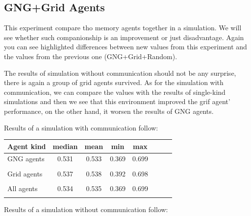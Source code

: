 \clearpage
                                       
\subsection{GNG+Grid Agents}

This experiment compare tho memory agents together in a simulation. We will see whether such companionship is an improvement or just disadvantage. Again you can see highlighted differences between new values from this experiment and the values from the previous one (GNG+Grid+Random).

The results of simulation without communication should not be any surprise, there is again a group of grid agents survived. As for the simulation with communication, we can compare the values with the results of single-kind simulations and then we see that this environment improved the grif agent' performance, on the other hand, it worsen the results of GNG agents.

Results of a simulation with communication follow:

\begin{center} 
  \begin{tabular}{l*{6}{c}r}
  Agent kind        & median & mean & min & max \\
  \hline
  GNG agents        & 0.531                  & 0.533                 & 0.369                 & 0.699  \\  
                    & \color{green}{+0.017}  & \color{green}{+0.018} & \color{green}{+0.002}  & \color{green}{+0.018} \\
  Grid agents       & 0.537                  & 0.538                 & 0.392                & 0.698  \\  
                    & \color{green}{+0.018}  & \color{green}{+0.017} & \color{green}{+0.012}& \color{red}{-0.005}   \\
  All agents        & 0.534                  & 0.535                 & 0.369                 & 0.699  \\
                    & \color{green}{+0.016}  & \color{green}{+0.015}  & \color{red}{+0.003}  & \color{red}{-0.004} 
  \end{tabular}                       
\end{center}

Results of a simulation without communication follow:

